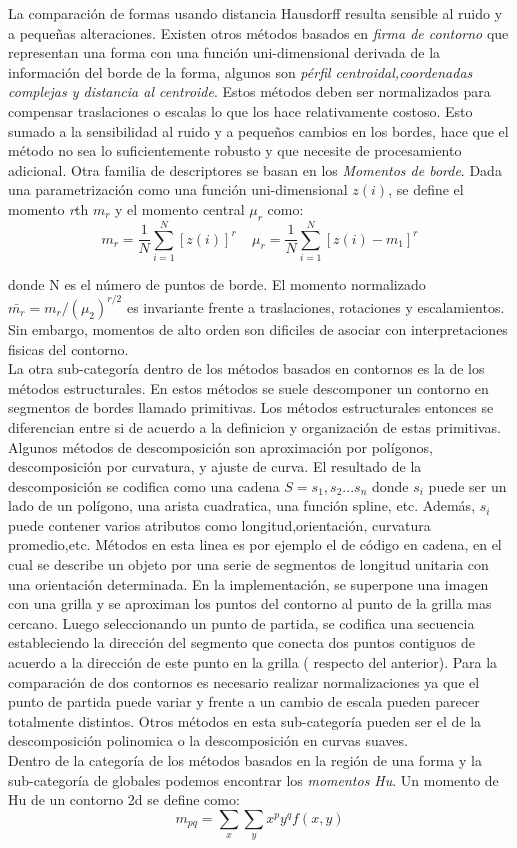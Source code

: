 La comparación de formas usando distancia Hausdorff resulta sensible al ruido y a pequeñas alteraciones. Existen otros métodos basados
en \textit{firma de contorno} que  representan una forma con una función uni-dimensional derivada de la información del borde de la forma, 
algunos son \textit{pérfil centroidal,coordenadas complejas y distancia al centroide}. Estos métodos deben ser normalizados para compensar
traslaciones o escalas lo que los hace relativamente costoso. Esto sumado a la sensibilidad al ruido y a pequeños cambios en los bordes, hace que el método 
no sea lo suficientemente robusto y que necesite de procesamiento adicional. Otra familia de descriptores se basan en los 
\textit{Momentos de borde}. Dada una parametrización como una función uni-dimensional $z(i)$, se define el momento \textit{r}th \textit{$m_r$} 
y el momento central $\mu_r$ como:
\[
	m_r=\frac{1}{N} \sum_{i=1}^{N}{[z(i)]^r}\ \ \ \ \
	\mu_r=\frac{1}{N} \sum_{i=1}^{N}{[z(i) - m_1]^r}
\]

donde N es el número de puntos de borde. El momento normalizado $\bar{m_r}=m_r / (\mu_2)^{r/2}$
es invariante frente a traslaciones, rotaciones y escalamientos. Sin embargo, momentos de alto orden
son dificiles de asociar con interpretaciones fisicas del contorno.\\
\indent La otra sub-categoría dentro de los métodos basados en contornos es la de los métodos estructurales.
En estos métodos se suele descomponer un contorno en segmentos de bordes llamado primitivas. Los métodos estructurales
entonces se diferencian entre si de acuerdo a la definicion y organización de estas primitivas. Algunos métodos
de descomposición son aproximación por polígonos, descomposición por curvatura, y ajuste de curva. El resultado
de la descomposición se codifica como una cadena $S=s_1,s_2...s_n$ donde $s_i$ puede ser un lado de un polígono, una 
arista cuadratica, una función spline, etc. Además, $s_i$ puede contener varios atributos como longitud,orientación, curvatura promedio,etc.
Métodos en esta linea es por ejemplo el de código en cadena, en el cual se describe un objeto por una serie de segmentos de longitud unitaria
con una orientación determinada. En la implementación, se superpone una imagen con una grilla y se aproximan los puntos del contorno al 
punto de la grilla mas cercano. Luego seleccionando un punto de partida, se codifica una secuencia estableciendo la dirección del segmento
que conecta dos puntos contiguos de acuerdo a la dirección de este punto en la grilla ( respecto del anterior). Para la comparación de dos
contornos es necesario realizar normalizaciones ya que el punto de partida puede variar y frente a un cambio de escala pueden parecer totalmente
distintos. Otros métodos en esta sub-categoría pueden ser el de la descomposición polinomica o la descomposición en curvas suaves. \\
\indent Dentro de la categoría de los métodos basados en la región de una forma y la sub-categoría de globales podemos encontrar los \textit{momentos Hu}.
Un momento de Hu de un contorno 2d se define como:
\[
	m_{pq}=\sum_{x}{\sum_{y}{x^py^qf(x,y)}}
\]

